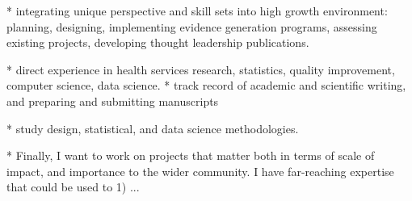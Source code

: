\documentclass[9pt, a4paper]{maedbh-cv}
\begin{document}
\begin{cvletter}
* integrating unique perspective and skill sets into high growth environment: planning, designing, implementing evidence generation programs, assessing existing projects, developing thought leadership publications. 

* direct experience in health services research, statistics, quality improvement, computer science, data science. 
* track record of academic and scientific writing, and preparing and submitting manuscripts 

* study design, statistical, and data science methodologies. 

* Finally, I want to work on projects that matter both in terms of scale of impact, and importance to the wider community. I have far-reaching expertise that could be used to 1) ...
 

\end{cvletter}

\makeletterclosing
\end{document}
